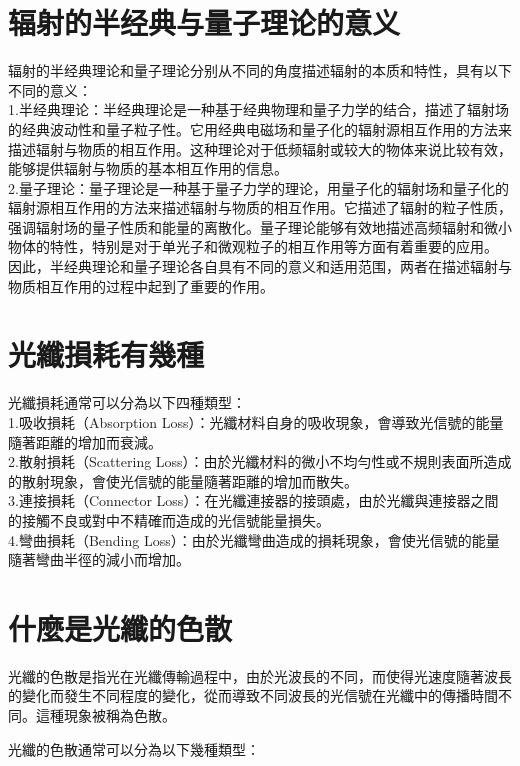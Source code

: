 \documentclass[12pt, a4paper, oneside]{article}
\begin{document}
\begin{spacing}{2.0}
\section{辐射的半经典与量子理论的意义}
辐射的半经典理论和量子理论分别从不同的角度描述辐射的本质和特性，具有以下不同的意义：
\\
1.半经典理论：半经典理论是一种基于经典物理和量子力学的结合，描述了辐射场的经典波动性和量子粒子性。它用经典电磁场和量子化的辐射源相互作用的方法来描述辐射与物质的相互作用。这种理论对于低频辐射或较大的物体来说比较有效，能够提供辐射与物质的基本相互作用的信息。
\\
2.量子理论：量子理论是一种基于量子力学的理论，用量子化的辐射场和量子化的辐射源相互作用的方法来描述辐射与物质的相互作用。它描述了辐射的粒子性质，强调辐射场的量子性质和能量的离散化。量子理论能够有效地描述高频辐射和微小物体的特性，特别是对于单光子和微观粒子的相互作用等方面有着重要的应用。
\\
因此，半经典理论和量子理论各自具有不同的意义和适用范围，两者在描述辐射与物质相互作用的过程中起到了重要的作用。
\section{光纖損耗有幾種}
光纖損耗通常可以分為以下四種類型：\\

1.吸收損耗（Absorption Loss）：光纖材料自身的吸收現象，會導致光信號的能量隨著距離的增加而衰減。\\

2.散射損耗（Scattering Loss）：由於光纖材料的微小不均勻性或不規則表面所造成的散射現象，會使光信號的能量隨著距離的增加而散失。\\

3.連接損耗（Connector Loss）：在光纖連接器的接頭處，由於光纖與連接器之間的接觸不良或對中不精確而造成的光信號能量損失。\\

4.彎曲損耗（Bending Loss）：由於光纖彎曲造成的損耗現象，會使光信號的能量隨著彎曲半徑的減小而增加。\\

\section{什麼是光纖的色散}
光纖的色散是指光在光纖傳輸過程中，由於光波長的不同，而使得光速度隨著波長的變化而發生不同程度的變化，從而導致不同波長的光信號在光纖中的傳播時間不同。這種現象被稱為色散。

光纖的色散通常可以分為以下幾種類型：\\


\end{spacing}
\end{document}
